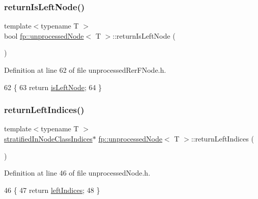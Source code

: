\subsubsection{\texorpdfstring{return\+Is\+Left\+Node()}{returnIsLeftNode()}\hspace{0.1cm}{\footnotesize\ttfamily [2/2]}}
{\footnotesize\ttfamily template$<$typename T $>$ \\
bool \hyperlink{classfp_1_1unprocessedNode}{fp\+::unprocessed\+Node}$<$ T $>$\+::return\+Is\+Left\+Node (\begin{DoxyParamCaption}{ }\end{DoxyParamCaption})\hspace{0.3cm}{\ttfamily [inline]}}



Definition at line 62 of file unprocessed\+Rer\+F\+Node.\+h.


\begin{DoxyCode}
62                                               \{
63                     \textcolor{keywordflow}{return} \hyperlink{classfp_1_1unprocessedNode_a81b74c36ed1ac15d367e135e2fa0ba3d}{isLeftNode};
64                 \}
\end{DoxyCode}
\mbox{\label{classfp_1_1unprocessedNode_a8738e5776d4f2da34e328196beea11a5}} 
\subsubsection{\texorpdfstring{return\+Left\+Indices()}{returnLeftIndices()}\hspace{0.1cm}{\footnotesize\ttfamily [1/2]}}
{\footnotesize\ttfamily template$<$typename T $>$ \\
\hyperlink{classfp_1_1stratifiedInNodeClassIndices}{stratified\+In\+Node\+Class\+Indices}$\ast$ \hyperlink{classfp_1_1unprocessedNode}{fp\+::unprocessed\+Node}$<$ T $>$\+::return\+Left\+Indices (\begin{DoxyParamCaption}{ }\end{DoxyParamCaption})\hspace{0.3cm}{\ttfamily [inline]}}



Definition at line 46 of file unprocessed\+Node.\+h.


\begin{DoxyCode}
46                                                                         \{
47                     \textcolor{keywordflow}{return} \hyperlink{classfp_1_1unprocessedNode_a8e39fa0144bbb78fd02d1973bd05b5f6}{leftIndices};
48                 \}
\end{DoxyCode}
\mbox{\label{classfp_1_1unprocessedNode_a8738e5776d4f2da34e328196beea11a5}} 
